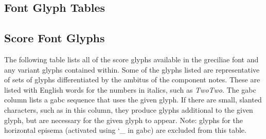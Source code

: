 %
%
%
%
%
%
\begin{landscape}

\section{Font Glyph Tables}\label{glyphtable}

\subsection{Score Font Glyphs}

The following table lists all of the score glyphs available in the greciliae
font and any variant glyphs contained within.  Some of the glyphs listed are
representative of sets of glyphs differentiated by the ambitus of the component
notes.  These are listed with English words for the numbers in italics, such as
{\itshape TwoTwo}.  The gabc column lists a gabc sequence that uses the given
glyph.  If there are small, slanted characters, such as  in this
column, they produce glyphs additional to the given glyph, but are necessary
for the given glyph to appear.  Note: glyphs for the horizontal episema
(activated using {\ttfamily\char`_} in gabc) are excluded from this table.


\end{landscape}

